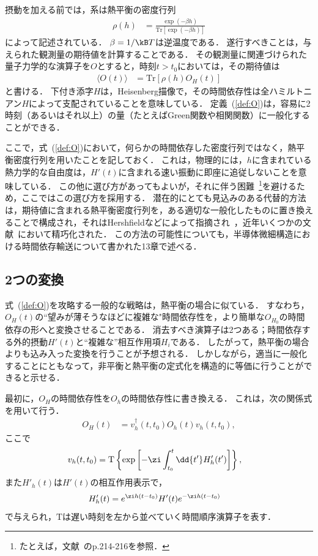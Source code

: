 \documentclass[a4paper,10pt]{jsarticle}
\begin{document}
摂動を加える前では，系は熱平衡の密度行列
\begin{align}
\rho (h)
	& = \frac{ \exp( - \beta h) }{ \mathrm{Tr}[ \exp(- \beta h) ] }
\end{align}
によって記述されている．
$\beta = 1 / \kB T$は逆温度である．
遂行すべきことは，与えられた観測量の期待値を計算することである．
その観測量に関連づけられた量子力学的な演算子を$O$とすると，時刻$t > t_0$においては，その期待値は
\begin{align}
\langle O (t) \rangle
	& = \mathrm{Tr} [ \rho (h) O_{H} (t) ]
\label{def:O}
\end{align}
と書ける．
下付き添字$H$は，Heisenberg描像で，その時間依存性は全ハミルトニアン$H$によって支配されていることを意味している．
定義~(\ref{def:O})は，容易に2時刻（あるいはそれ以上）の量（たとえばGreen関数や相関関数）に一般化することができる．

ここで，式~(\ref{def:O})において，何らかの時間依存した密度行列ではなく，熱平衡密度行列を用いたことを記しておく．
これは，物理的には，$h$に含まれている熱力学的な自由度は，$H'(t)$に含まれる速い振動に即座に追従しないことを意味している．
この他に選び方があってもよいが，それに伴う困難~\footnote{たとえば，文献~\cite{Mahan}のp.214-216を参照．}を避けるため，ここではこの選び方を採用する．
潜在的にとても見込みのある代替的方法は，期待値に含まれる熱平衡密度行列を，ある適切な一般化したものに置き換えることで構成され，それはHershfieldなどによって指摘され~\cite{Hershfield}，近年いくつかの文献~\cite{Bokes,Coleman,Doyon,Han}において精巧化された．
この方法の可能性についても，半導体微細構造における時間依存輸送について書かれた13章で述べる．

\subsection{2つの変換}
式~(\ref{def:O})を攻略する一般的な戦略は，熱平衡の場合に似ている．
すなわち，$O_H (t)$の``望みが薄そうなほどに複雑な"時間依存性を，より簡単な$O_{H_0}$の時間依存の形へと変換させることである．
消去すべき演算子は2つある；時間依存する外的摂動$H' (t)$と``複雑な''相互作用項$H_i$である．
したがって，熱平衡の場合よりも込み入った変換を行うことが予想される．
しかしながら，適当に一般化することにともなって，非平衡と熱平衡の定式化を構造的に等価に行うことができると示せる．

最初に，$O_H$の時間依存性を$O_h$の時間依存性に書き換える．
これは，次の関係式を用いて行う．
\begin{align}
O_H (t)
	& = v_h^{\dagger} (t, t_0) O_h (t) v_h (t, t_0)
\label{eq:O_H}
,\end{align}
ここで
\begin{align}
v_h (t, t_0)
	& = \mathrm{T} \left\{ \exp \left[ - \zi \int_{t_0}^{t} \dd{t'} H'_h (t') \right] \right\}
,\end{align}
また$H'_h (t)$は$H' (t)$の相互作用表示で，
\begin{align}
H'_h (t)
	& = e^{\zi h (t - t_0)} H' (t) e^{- \zi h (t - t_0)}
\end{align}
で与えられ，$\mathrm{T}$は遅い時刻を左から並べていく時間順序演算子を表す．
\end{document}
